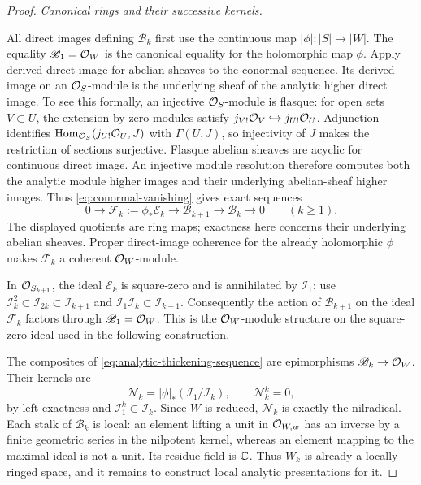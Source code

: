 \begin{proof}
\par\medskip\noindent\textit{Canonical rings and their successive kernels.}\par
All direct images defining \(\mathscr B_k\) first use the continuous
map \(|\phi|:|S|\to|W|\).  The equality
\(\mathscr B_1=\mathcal O_W\) is the canonical equality for the holomorphic
map \(\phi\).  Apply derived direct image for abelian sheaves to the
conormal sequence.  Its derived image on an \(\mathcal O_S\)-module is the
underlying sheaf of the analytic higher direct image.  To see this
formally, an injective \(\mathcal O_S\)-module is flasque: for open sets
\(V\subset U\), the extension-by-zero modules satisfy
\(j_{V!}\mathcal O_V\hookrightarrow j_{U!}\mathcal O_U\).  Adjunction identifies
\(\operatorname{Hom}_{\mathcal O_S}(j_{U!}\mathcal O_U,J)\) with
\(\Gamma(U,J)\), so injectivity of \(J\) makes the restriction of
sections surjective.  Flasque abelian sheaves are acyclic for continuous
direct image.  An injective
module resolution therefore computes both the analytic module higher
images and their underlying abelian-sheaf higher images.  Thus
\eqref{eq:conormal-vanishing} gives exact sequences
\begin{equation}\label{eq:analytic-thickening-sequence}
 0\longrightarrow \mathscr F_k:=\phi_*\mathscr E_k
 \longrightarrow\mathscr B_{k+1}
 \longrightarrow\mathscr B_k\longrightarrow0\qquad(k\geq1).
\end{equation}
The displayed quotients are ring maps; exactness here concerns their
underlying abelian sheaves.  Proper direct-image coherence for the
already holomorphic \(\phi\)
\cite[Theorem~1.1, p.~15-01]{Grothendieck1961TechniquesVIII}
makes \(\mathscr F_k\) a coherent
\(\mathcal O_W\)-module.

In \(\mathcal O_{S_{k+1}}\), the ideal \(\mathscr E_k\) is square-zero and
is annihilated by \(\mathscr I_1\): use
\(\mathscr I_k^2\subset\mathscr I_{2k}\subset\mathscr I_{k+1}\)
and \(\mathscr I_1\mathscr I_k\subset\mathscr I_{k+1}\).
Consequently the action of \(\mathscr B_{k+1}\) on the ideal
\(\mathscr F_k\) factors through \(\mathscr B_1=\mathcal O_W\).
This is the \(\mathcal O_W\)-module structure on the square-zero ideal used
in the following construction.

The composites of \eqref{eq:analytic-thickening-sequence} are
epimorphisms \(\mathscr B_k\to\mathcal O_W\).  Their kernels are
\[
 \mathscr N_k=|\phi|_*(\mathscr I_1/\mathscr I_k),
 \qquad \mathscr N_k^k=0,
\]
by left exactness and \(\mathscr I_1^k\subset\mathscr I_k\).
Since \(W\) is reduced, \(\mathscr N_k\) is exactly the nilradical.
Each stalk of \(\mathscr B_k\) is local: an element lifting a unit in
\(\mathcal O_{W,w}\) has an inverse by a finite geometric series in the
nilpotent kernel, whereas an element mapping to the maximal ideal is
not a unit.  Its residue field is \(\mathbb C\).  Thus \(W_k\) is already
a locally ringed space, and it remains to construct local analytic
presentations for it.


\end{proof}
